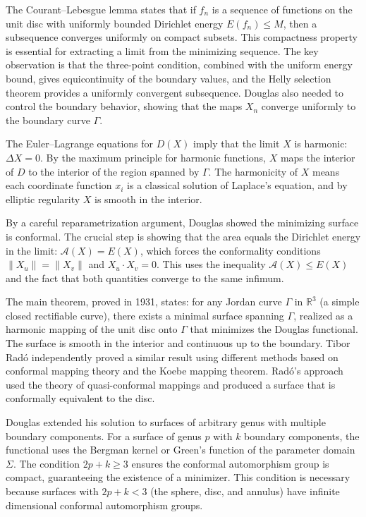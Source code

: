 The Courant--Lebesgue lemma states that if $f_n$ is a sequence of
functions on the unit disc with uniformly bounded Dirichlet energy
$E(f_n) \leq M$, then a subsequence converges uniformly on compact
subsets. This compactness property is essential for extracting a limit
from the minimizing sequence. The key observation is that the
three-point condition, combined with the uniform energy bound, gives
equicontinuity of the boundary values, and the Helly selection theorem
provides a uniformly convergent subsequence. Douglas also needed to
control the boundary behavior, showing that the maps $X_n$ converge
uniformly to the boundary curve $\Gamma$.

The Euler--Lagrange equations for $D(X)$ imply that the limit $X$ is
harmonic: $\Delta X = 0$. By the maximum principle for harmonic
functions, $X$ maps the interior of $D$ to the interior of the region
spanned by $\Gamma$. The harmonicity of $X$ means each coordinate
function $x_i$ is a classical solution of Laplace's equation, and by
elliptic regularity $X$ is smooth in the interior.

By a careful reparametrization argument, Douglas showed the minimizing
surface is conformal. The crucial step is showing that the area equals
the Dirichlet energy in the limit: $\mathcal{A}(X) = E(X)$, which forces
the conformality conditions $\|X_u\| = \|X_v\|$ and $X_u \cdot X_v = 0$.
This uses the inequality $\mathcal{A}(X) \leq E(X)$ and the fact that
both quantities converge to the same infimum.

The main theorem, proved in 1931, states: for any Jordan curve $\Gamma$
in $\mathbb{R}^3$ (a simple closed rectifiable curve), there exists a
minimal surface spanning $\Gamma$, realized as a harmonic mapping of the
unit disc onto $\Gamma$ that minimizes the Douglas functional. The
surface is smooth in the interior and continuous up to the boundary.
Tibor Rad\'{o} independently proved a similar result using different
methods based on conformal mapping theory and the Koebe mapping theorem.
Rad\'{o}'s approach used the theory of quasi-conformal mappings and
produced a surface that is conformally equivalent to the disc.

Douglas extended his solution to surfaces of arbitrary genus with
multiple boundary components. For a surface of genus $p$ with $k$
boundary components, the functional uses the Bergman kernel or Green's
function of the parameter domain $\Sigma$. The condition $2p + k \geq 3$
ensures the conformal automorphism group is compact, guaranteeing the
existence of a minimizer. This condition is necessary because surfaces
with $2p + k < 3$ (the sphere, disc, and annulus) have infinite
dimensional conformal automorphism groups.

